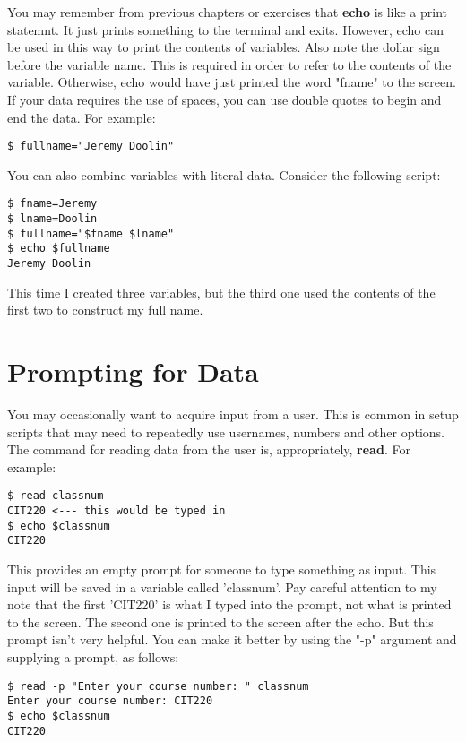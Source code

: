 You may remember from previous chapters or exercises that \textbf{echo} is like a print statemnt.  It just prints something to the terminal and exits.  However, echo can be used in this way to print the contents of variables.  Also note the dollar sign before the variable name.  This is required in order to refer to the contents of the variable.  Otherwise, echo would have just printed the word "fname" to the screen.\\

If your data requires the use of spaces, you can use double quotes to begin and end the data.  For example:

\begin{verbatim}
$ fullname="Jeremy Doolin"
\end{verbatim}

You can also combine variables with literal data.  Consider the following script:

\begin{verbatim}
$ fname=Jeremy
$ lname=Doolin
$ fullname="$fname $lname"
$ echo $fullname
Jeremy Doolin
\end{verbatim}

This time I created three variables, but the third one used the contents of the first two to construct my full name.

\section{Prompting for Data}

You may occasionally want to acquire input from a user.  This is common in setup scripts that may need to repeatedly use usernames, numbers and other options.  The command for reading data from the user is, appropriately, \textbf{read}.  For example:

\begin{verbatim}
$ read classnum
CIT220 <--- this would be typed in
$ echo $classnum
CIT220
\end{verbatim}

This provides an empty prompt for someone to type something as input.  This input will be saved in a variable called 'classnum'.  Pay careful attention to my note that the first 'CIT220' is what I typed into the prompt, not what is printed to the screen.  The second one is printed to the screen after the echo.  But this prompt isn't very helpful.  You can make it better by using the "-p" argument and supplying a prompt, as follows:

\begin{verbatim}
$ read -p "Enter your course number: " classnum
Enter your course number: CIT220
$ echo $classnum
CIT220
\end{verbatim}

